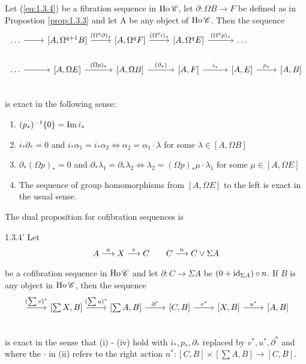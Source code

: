 \documentclass[../main]{subfiles}
\begin{document}
\begin{proposition} \label{prop:1.3.4}
    Let (\ref{eq:1.3.4}) be a fibration sequence in $\operatorname{Ho} \mathscr{C}$, let $\partial : \Omega B \longrightarrow F$ be defined as in Propostion \ref{prop:1.3.3} and let A be any object of $\operatorname{Ho} \mathscr{C}$.  Then the sequence
\[
\begin{tikzcd}
    \dots \arrow[r]
        & {[A, \Omega^{q+1}B]} \arrow[r, "(\Omega^q\partial)_*"]
            & {[A, \Omega^q F]} \arrow[r, "(\Omega^q i)_*"]
                & {[A, \Omega^q E]} \arrow[r, "(\Omega^q p)_*"]
                    & \dots \\
    \dots \arrow[r]
        & {[A, \Omega E]} \arrow[r, "(\Omega p)_*"]
            & {[A, \Omega B]} \arrow[r, "(\partial_*)"]
                & {[A, F]} \arrow[r, "i_*"]
                    & {[A, E]} \arrow[r, "p_*"]
                        & {[A,B]} \\
\end{tikzcd}
\]
is exact in the following sense:
\begin{enumerate}[label=(\roman*)]
  \item $(p_*)^{-1}\{0\} = \operatorname{Im} i_*$
  \item $i_*\partial_* = 0$ and $i_* \alpha_1 = i_*\alpha_2 \iff \alpha_2 = \alpha_1 \cdot \lambda $ for some $\lambda \in [A, \Omega B]$
  \item $\partial_* (\Omega p)_* = 0$ and $\partial_* \lambda_1 = \partial_* \lambda_2 \iff \lambda_2 = (\Omega p)_* \mu \cdot \lambda_1$ for some $\mu \in [A, \Omega E]$
  \item The sequence of group homomorphisms from $[A, \Omega E]$ to the left is exact in the usual sense.
\end{enumerate}

\end{proposition}

The dual proposition for cofibration sequences is

\begin{customprop}{1.3.4'} \label{prop:1.3.4'}
    Let \[A \varrightarrow{u} X \varrightarrow{v} C \quad\quad C \varrightarrow{n} C \vee \Sigma A\]
    be a cofibration sequence in $\operatorname{Ho} \mathscr{C}$ and let $\partial:C \longrightarrow \Sigma A$ be $(0 + \operatorname{id}_{\Sigma A}) \circ n$. If $B$ is any object in $\operatorname{Ho} \mathscr{C}$, then the sequence
    \[
    \begin{tikzcd}
    \arrow[r,"(\sum v)^*"] & {[\sum X, B]} \arrow[r,"(\sum u)^*"] & {[\sum A, B]} \arrow[r,"\partial^*"]
        & {[C,B]} \arrow[r,"v^*"] & {[X,B]} \arrow[r,"u^*"] & {[A,B]} \\
    \end{tikzcd}
    \]
    is exact in the sense that (i) - (iv) hold with $i_*, p_*, \partial_*$ replaced by $v^*,u^*,\partial^*$ and where the $\cdot$ in (ii) refers to the right action $n^*:[C,B] \times [\sum A, B] \longrightarrow [C,B]$.
    \end{customprop}
\end{document}
